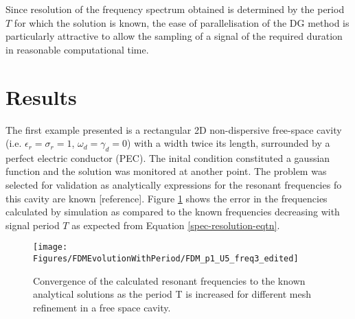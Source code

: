 \documentclass[times,11pt]{ACME2015article}
\begin{document}
\begin{normalsize}
Since resolution of the frequency spectrum obtained is determined by the period $T$ for which the solution is known, the ease of parallelisation of the DG method is particularly attractive to allow the sampling of a signal of the required duration in reasonable computational time.

\section{Results}


The first example presented is a rectangular 2D non-dispersive free-space cavity (i.e. $\epsilon_r = \sigma_r = 1$, $\omega_d = \gamma_d = 0$) with a width twice its length, surrounded by a perfect electric conductor (PEC). The inital condition constituted a gaussian function %
and the solution was monitored at another point. %
The problem was selected for validation as analytically expressions for the resonant frequencies fo this cavity are known [reference]. Figure \ref{freeSpaceConvergence} shows the error in the frequencies calculated by simulation as compared to the known frequencies decreasing with signal period $T$ as expected from Equation \ref{spec-resolution-eqtn}.


\begin{figure}[htbp!]
 \centering
 \texttt{[image: Figures/FDMEvolutionWithPeriod/FDM\_p1\_U5\_freq3\_edited]}
 \caption{Convergence of the calculated resonant frequencies to the known analytical solutions as the period T is increased for different mesh refinement in a free space cavity.}
 \label{freeSpaceConvergence}
\end{figure}



\end{normalsize}
\end{document}
